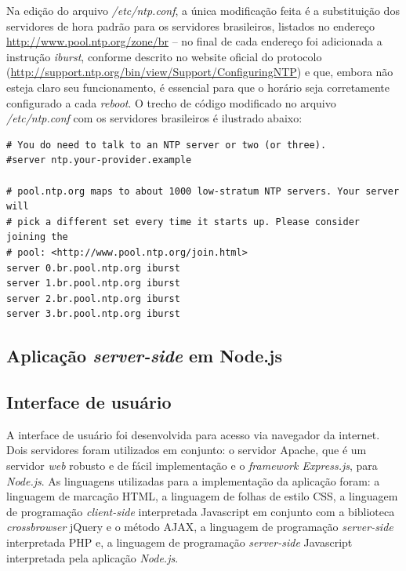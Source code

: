 Na edição do arquivo \textit{/etc/ntp.conf}, a única modificação feita é a substituição dos servidores de hora padrão para os servidores brasileiros, listados no endereço \url{http://www.pool.ntp.org/zone/br} -- no final de cada endereço foi adicionada a instrução \textit{iburst}, conforme descrito no website oficial do protocolo (\url{http://support.ntp.org/bin/view/Support/ConfiguringNTP}) e que, embora não esteja claro seu funcionamento, é essencial para que o horário seja corretamente configurado a cada \textit{reboot}. O trecho de código modificado no arquivo \textit{/etc/ntp.conf} com os servidores brasileiros é ilustrado abaixo:

\lstset{language=bash}
\begin{lstlisting}[frame=single, basicstyle=\linespread{0.85}\ttfamily]
# You do need to talk to an NTP server or two (or three).
#server ntp.your-provider.example

# pool.ntp.org maps to about 1000 low-stratum NTP servers. Your server will
# pick a different set every time it starts up. Please consider joining the
# pool: <http://www.pool.ntp.org/join.html>
server 0.br.pool.ntp.org iburst
server 1.br.pool.ntp.org iburst
server 2.br.pool.ntp.org iburst
server 3.br.pool.ntp.org iburst
\end{lstlisting}


\subsection{Aplicação \textit{server-side} em Node.js}

\subsection{Interface de usuário}

A interface de usuário foi desenvolvida para acesso via navegador da internet. Dois servidores foram utilizados em conjunto: o servidor Apache, que é um servidor \textit{web} robusto e de fácil implementação e o \textit{framework Express.js}, para \textit{Node.js}. As linguagens utilizadas para a implementação da aplicação foram: a linguagem de marcação HTML, a linguagem de folhas de estilo CSS, a linguagem de programação \textit{client-side} interpretada Javascript em conjunto com a biblioteca \textit{crossbrowser} jQuery e o método AJAX, a linguagem de programação \textit{server-side} interpretada PHP e, a linguagem de programação \textit{server-side} Javascript interpretada pela aplicação \textit{Node.js}.

